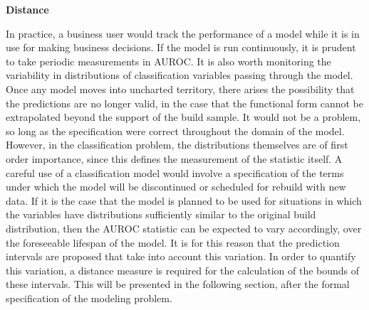 \textbf{Distance}

In practice, a business user would track the performance of a model while it is in use for making business decisions. 
If the model is run continuously, it is prudent to take periodic measurements in AUROC. 
It is also worth monitoring the variability in distributions of classification variables passing through the model. 
Once any model moves into uncharted territory, there arises the possibility that the predictions are no longer valid, in the case that the functional form cannot be extrapolated beyond the support of the build sample. 
It would not be a problem, so long as the specification were correct throughout the domain of the model. 
However, in the classification problem, the distributions themselves are of first order importance, since this defines the measurement of the statistic itself. 
A careful use of a classification model would involve a specification of the terms under which the model will be discontinued or scheduled for rebuild with new data. 
If it is the case that the model is planned to be used for situations in which the variables have distributions sufficiently similar to the original build distribution, then the AUROC statistic can be expected to vary accordingly, over the foreseeable lifespan of the model. 
It is for this reason that the prediction intervals are proposed that take into account this variation. 
% 
% 
In order to quantify this variation, a distance measure is required for the calculation of the bounds of these intervals. 
%
%
This will be presented in the following section, after the formal specification of the modeling problem. 



